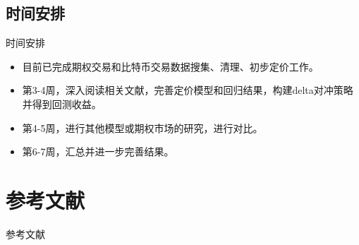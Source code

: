 \documentclass[11pt,dark]{mathbeamer}
\begin{document}
\subsection{时间安排}
\begin{frame}{时间安排}
  \begin{itemize}
    \item 目前已完成期权交易和比特币交易数据搜集、清理、初步定价工作。
    \item 第3-4周，深入阅读相关文献，完善定价模型和回归结果，构建delta对冲策略并得到回测收益。
    \item 第4-5周，进行其他模型或期权市场的研究，进行对比。
    \item 第6-7周，汇总并进一步完善结果。
  \end{itemize}
\end{frame}

\section*{参考文献}
    \begin{frame}{参考文献}
        
		
	\end{frame}
\end{document}
